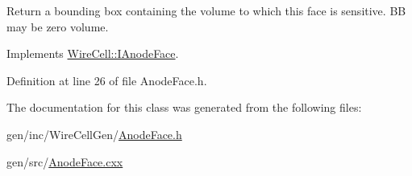 Return a bounding box containing the volume to which this face is sensitive. BB may be zero volume. 

Implements \hyperlink{class_wire_cell_1_1_i_anode_face_a74d5eec4031d0c78a17cf80d5ccae2cc}{Wire\+Cell\+::\+I\+Anode\+Face}.



Definition at line 26 of file Anode\+Face.\+h.



The documentation for this class was generated from the following files\+:\begin{DoxyCompactItemize}
\item 
gen/inc/\+Wire\+Cell\+Gen/\hyperlink{_anode_face_8h}{Anode\+Face.\+h}\item 
gen/src/\hyperlink{_anode_face_8cxx}{Anode\+Face.\+cxx}\end{DoxyCompactItemize}

